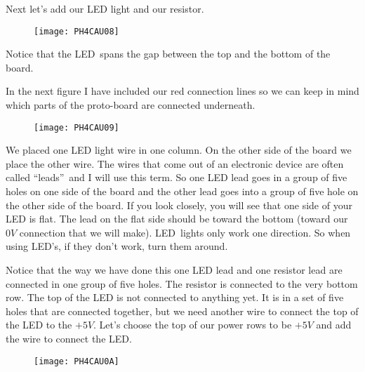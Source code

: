 Next let's add our LED light and our resistor. \begin{figure}[h!]
\texttt{[image: PH4CAU08]}
\end{figure}Notice that the LED\ spans the
gap between the top and the bottom of the board.

In the next figure I have included our red connection lines so we can keep
in mind which parts of the proto-board are connected underneath.\begin{figure}[h!]
\texttt{[image: PH4CAU09]}
\end{figure}

We placed one LED light wire in one column. On the other side of the board
we place the other wire. The wires that come out of an electronic device are
often called \textquotedblleft leads\textquotedblright\ and I will use this
term. So one LED lead goes in a group of five holes on one side of the board
and the other lead goes into a group of five hole on the other side of the
board. If you look closely, you will see that one side of your LED is flat.
The lead on the flat side should be toward the bottom (toward our $0\unit{V}$
connection that we will make). LED\ lights only work one direction. So when
using LED's, if they don't work, turn them around.

Notice that the way we have done this one LED lead and one resistor lead are
connected in one group of five holes. The resistor is connected to the very
bottom row. The top of the LED is not connected to anything yet. It is in a
set of five holes that are connected together, but we need another wire to
connect the top of the LED to the $+5\unit{V}.$ Let's choose the top of our
power rows to be $+5\unit{V}$ and add the wire to connect the LED. \begin{figure}[h!]
\texttt{[image: PH4CAU0A]}
\end{figure}

